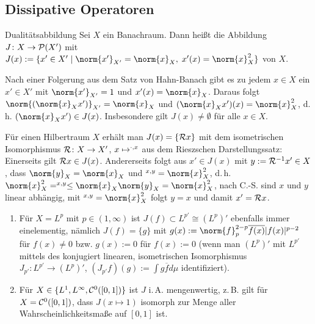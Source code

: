 \subsection{%
    Dissipative Operatoren%
}

\begin{Def}{Dualitätsabbildung}
    Sei $X$ ein Banachraum.
    Dann heißt die Abbildung $J\colon X \to \P(X')$ mit
    $J(x) := \{x' \in X' \;|\; \norm{x'}_{X'} = \norm{x}_X,\; x'(x) = \norm{x}_X^2\}$
     von $X$.
\end{Def}

\linie

\begin{Bem}
    Nach einer Folgerung aus dem Satz von Hahn-Banach gibt es zu jedem $x \in X$
    ein $x' \in X'$ mit $\norm{x'}_{X'} = 1$ und
    $x'(x) = \norm{x}_X$.
    Daraus folgt $\norm{(\norm{x}_X x')}_{X'} = \norm{x}_X$ und
    $(\norm{x}_X x')(x) = \norm{x}_X^2$, d.\,h. $(\norm{x}_X x') \in J(x)$.
    Insbesondere gilt $J(x) \not= \emptyset$ für alle $x \in X$.
\end{Bem}
    
\begin{Bem}
    Für einen Hilbertraum $X$ erhält man $J(x) = \{\R x\}$ mit dem isometrischen Isomorphismus
    $\R\colon X \to X'$, $x \mapsto \sp{\cdot, x}$ aus dem Rieszschen Darstellungssatz:
    Einerseits gilt $\R x \in J(x)$.
    Andererseits folgt aus $x' \in J(x)$ mit $y := \R^{-1} x' \in X$,
    dass $\norm{y}_X = \norm{x}_X$ und $\sp{x, y} = \norm{x}_X^2$,
    d.\,h. $\norm{x}_X^2 = \sp{x, y} \le \norm{x}_X \norm{y}_X = \norm{x}_X^2$,
    nach C.-S. sind $x$ und $y$ linear abhängig, mit $\sp{x, y} = \norm{x}_X^2$ folgt $y = x$
    und damit $x' = \R x$.
\end{Bem}

\begin{Bsp}
    \begin{enumerate}
        \item
        Für $X = L^p$ mit $p \in (1, \infty)$ ist $J(f) \subset L^{p'} \cong (L^p)'$ ebenfalls immer
        einelementig, nämlich $J(f) = \{g\}$ mit
        $g(x) := \norm{f}_p^{2-p} \overline{f(x)} |f(x)|^{p-2}$ für $f(x) \not= 0$
        bzw. $g(x) := 0$ für $f(x) := 0$
        (wenn man $(L^p)'$ mit $L^{p'}$ mittels des konjugiert linearen, isometrischen Isomorphismus
        $J_{p'}\colon L^{p'} \to (L^p)'$, $(J_{p'} f)(g) := \int g \overline{f} d\mu$
        identifiziert).
        
        \item
        Für $X \in \{L^1, L^\infty, \C^0([0, 1])\}$ ist $J$ i.\,A. mengenwertig,
        z.\,B. gilt für $X = \C^0([0, 1])$, dass $J(x \mapsto 1)$
        isomorph zur Menge aller Wahrscheinlichkeitsmaße auf $[0, 1]$ ist.
    \end{enumerate}
\end{Bsp}

